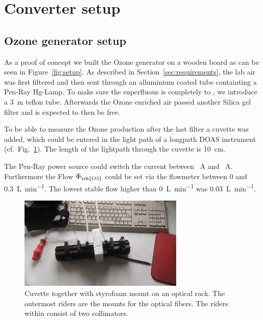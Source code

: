 \section{Converter setup}
\label{sec:setup}

\subsection{Ozone generator setup}
\label{sec:ozone-setup}

As a proof of concept we built the Ozone generator on a wooden board
as can be seen in Figure~\ref{fig:setup}. As described in
Section~\ref{sec:requirements}, the lab air was first filtered and
then sent through an alluminium coated tube containting a Pen-Ray
Hg-Lamp. To make sure the superfluous
 is completely to , we introduce a \SI{3}{\meter}
teflon tube. Afterwards the Ozone enriched air passed another Silica
gel filter and is expected to then be  free.

To be able to measure the Ozone production after the last filter a
cuvette was added, which could be entered in the light path of a
longpath DOAS instrument (cf.\ Fig.~\ref{fig:cuvette}). The length of
the lightpath through the cuvette is \SI{10}{\centi\meter}. 

The Pen-Ray power source could switch the current between
\SI{}{\ampere} and \SI{}{\ampere}. Furthermore the Flow $\Phi_{\ch{O 3}}$ could be set via the
flowmeter between \num{0} and \SI{0.3}{\liter\per\minute}. The lowest
stable flow higher than \SI{0}{\liter\per\minute} was
\SI{0.03}{\liter\per\minute}.

\begin{figure}[htbp]
  \centering
  \includegraphics[width=0.7\textwidth]{images/cuvette.jpg}
  \caption{Cuvette together with styrofoam mount on an optical
    rack. The outermost riders are the mounts for the optical
    fibers. The riders within consist of two collimators.}
  \label{fig:cuvette}
\end{figure}

